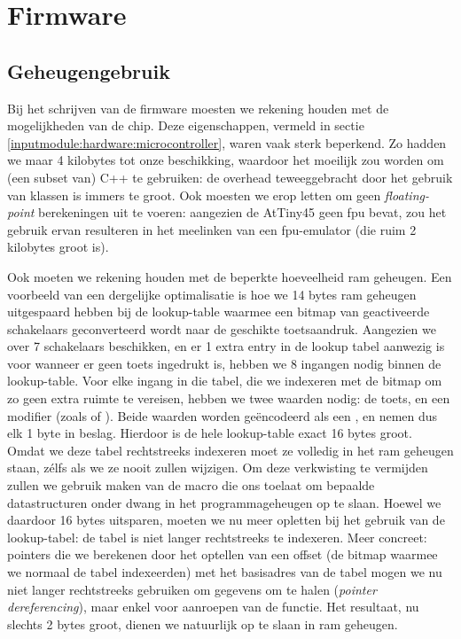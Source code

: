 \chapter{Firmware}
\label{inputmodule:firmware}

\section{Geheugengebruik}
\label{inputmodule:firmware:geheugengebruik}

Bij het schrijven van de firmware moesten we rekening houden met de mogelijkheden van de chip. Deze eigenschappen, vermeld in sectie \ref{inputmodule:hardware:microcontroller}, waren vaak sterk beperkend. Zo hadden we maar 4 kilobytes tot onze beschikking, waardoor het moeilijk zou worden om (een subset van) C++ te gebruiken: de overhead teweeggebracht door het gebruik van klassen is immers te groot. Ook moesten we erop letten om geen \emph{floating-point} berekeningen uit te voeren: aangezien de AtTiny45 geen \ac{fpu} bevat, zou het gebruik ervan resulteren in het meelinken van een \ac{fpu}-emulator (die ruim 2 kilobytes groot is).

Ook moeten we rekening houden met de beperkte hoeveelheid \ac{ram} geheugen. Een voorbeeld van een dergelijke optimalisatie is hoe we 14 bytes \ac{ram} geheugen uitgespaard hebben bij de lookup-table waarmee een bitmap van geactiveerde schakelaars geconverteerd wordt naar de geschikte toetsaandruk. Aangezien we over 7 schakelaars beschikken, en er 1 extra entry in de lookup tabel aanwezig is voor wanneer er geen toets ingedrukt is, hebben we 8 ingangen nodig binnen de lookup-table. Voor elke ingang in die tabel, die we indexeren met de bitmap om zo geen extra ruimte te vereisen, hebben we twee waarden nodig: de toets, en een modifier (zoals  of ). Beide waarden worden geëncodeerd als een , en nemen dus elk 1 byte in beslag. Hierdoor is de hele lookup-table exact 16 bytes groot. Omdat we deze tabel rechtstreeks indexeren moet ze volledig in het \ac{ram} geheugen staan, zélfs als we ze nooit zullen wijzigen. Om deze verkwisting te vermijden zullen we gebruik maken van de  macro die ons toelaat om bepaalde datastructuren onder dwang in het programmageheugen op te slaan. Hoewel we daardoor 16 bytes uitsparen, moeten we nu meer opletten bij het gebruik van de lookup-tabel: de tabel is niet langer rechtstreeks te indexeren. Meer concreet: pointers die we berekenen door het optellen van een offset (de bitmap waarmee we normaal de tabel indexeerden) met het basisadres van de tabel mogen we nu niet langer rechtstreeks gebruiken om gegevens om te halen (\emph{pointer dereferencing}), maar enkel voor aanroepen van de  functie. Het resultaat, nu slechts 2 bytes groot, dienen we natuurlijk op te slaan in \ac{ram} geheugen.


